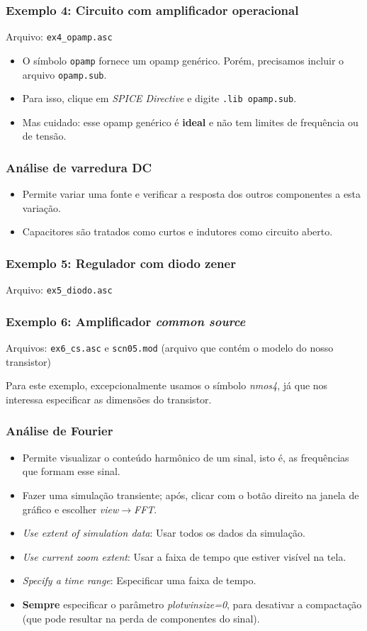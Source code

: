 \documentclass{beamer}
\begin{document}
\begin{frame}
\frametitle{Exemplo 4: Circuito com amplificador operacional}
Arquivo: \texttt{ex4\_opamp.asc}
\begin{itemize}
\item{O símbolo \texttt{opamp} fornece um opamp genérico. Porém, precisamos incluir o arquivo \texttt{opamp.sub}.}
\item{Para isso, clique em \textit{SPICE Directive} e digite \texttt{.lib opamp.sub}}.
\item{Mas cuidado: esse opamp genérico é \textbf{ideal} e não tem limites de frequência ou de tensão.}
\end{itemize}
\end{frame}

\begin{frame}
\frametitle{Análise de varredura DC}
\begin{itemize}
\item{Permite variar uma fonte e verificar a resposta dos outros componentes a esta variação.}
\item{Capacitores são tratados como curtos e indutores como circuito aberto.}
\end{itemize}
\end{frame}

\begin{frame}
\frametitle{Exemplo 5: Regulador com diodo zener}
Arquivo: \texttt{ex5\_diodo.asc}
\end{frame}

\begin{frame}
\frametitle{Exemplo 6: Amplificador \textit{common source}}
Arquivos: \texttt{ex6\_cs.asc} e \texttt{scn05.mod} (arquivo que contém o modelo do nosso transistor)

Para este exemplo, excepcionalmente usamos o símbolo \textit{nmos4}, já que nos interessa especificar as dimensões do transistor.
\end{frame}

\begin{frame}
\frametitle{Análise de Fourier}
\begin{itemize}
\item Permite visualizar o conteúdo harmônico de um sinal, isto é, as frequências que formam esse sinal.
\item Fazer uma simulação transiente; após, clicar com o botão direito na janela de gráfico e escolher \textit{view}$\rightarrow$\textit{FFT}.
\item \textit{Use extent of simulation data}: Usar todos os dados da simulação.
\item \textit{Use current zoom extent}: Usar a faixa de tempo que estiver visível na tela.
\item \textit{Specify a time range}: Especificar uma faixa de tempo.
\item \textbf{Sempre} especificar o parâmetro \textit{plotwinsize=0}, para desativar a compactação (que pode resultar na perda de componentes do sinal).
\end{itemize}
\end{frame}
\end{document}
